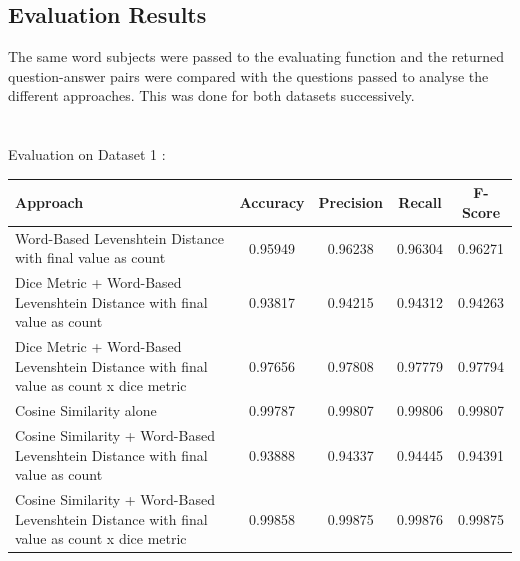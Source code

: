 \documentclass[12pt, a4paper]{article}
\begin{document}
\newpage 
\subsection{Evaluation Results} 

The same word subjects were passed to the evaluating function and the returned question-answer pairs were compared with the questions passed to analyse the different approaches. This was done for both datasets successively.  
\\~\\~\\ 
Evaluation on Dataset 1 : 
\begin{center}
  \renewcommand{\arraystretch}{1.5}
  \begin{tabular}{p{5.5cm}|c|c|c|c}
    Approach&Accuracy&Precision&Recall&F-Score \\ 
    \hline 
    Word-Based Levenshtein Distance with final value as count&0.95949&0.96238&0.96304&0.96271 \\
    Dice Metric + Word-Based Levenshtein Distance with final value as count&0.93817&0.94215&0.94312&0.94263 \\ 
    Dice Metric + Word-Based Levenshtein Distance with final value as count x dice metric&0.97656&0.97808&0.97779&0.97794 \\ 
    Cosine Similarity alone&0.99787&0.99807&0.99806&0.99807 \\
    Cosine Similarity + Word-Based Levenshtein Distance with final value as count&0.93888&0.94337&0.94445&0.94391 \\ 
    Cosine Similarity + Word-Based Levenshtein Distance with final value as count x dice metric&0.99858&0.99875&0.99876&0.99875 \\ 
\end{tabular} 
\end{center} 
\end{document}
